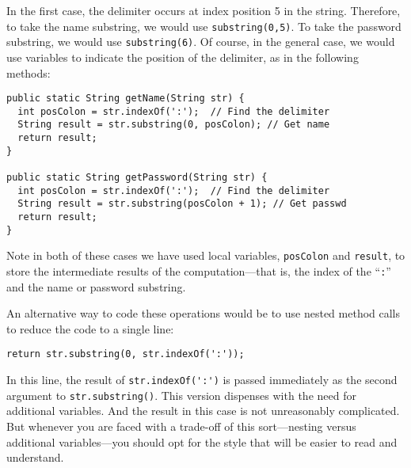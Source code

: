 \noindent In the first case, the delimiter occurs at index position 5 in
the string.  Therefore, to take the name substring, we would use
{\tt substring(0,5)}. To take the password substring, we would
use {\tt substring(6)}.  Of course, in the general case, we would
use variables to indicate the position of the delimiter, as in the
following methods:

\begin{jjjlisting}[27pc]
\begin{lstlisting}
public static String getName(String str) {
  int posColon = str.indexOf(':');  // Find the delimiter
  String result = str.substring(0, posColon); // Get name
  return result;
}

public static String getPassword(String str) {
  int posColon = str.indexOf(':');  // Find the delimiter
  String result = str.substring(posColon + 1); // Get passwd
  return result;
}
\end{lstlisting}
\end{jjjlisting}


\noindent Note in both of these cases we have used
local variables, {\tt posColon} and \mbox{\tt result}, to store the
intermediate results of the computation---that is, the index of the
``{\tt :}'' and the name or password substring.

An alternative way to code these operations would be to use nested
method calls to reduce the code to a single line:

\begin{jjjlisting}
\begin{lstlisting}
return str.substring(0, str.indexOf(':'));
\end{lstlisting}
\end{jjjlisting}

\noindent In this line, the result of {\tt str.indexOf(\verb!'!:\verb!'!)} is
passed immediately as the second argument to {\tt str.substring()}.
This version dispenses with the need for additional variables.
And the result in this case is not unreasonably complicated.
But whenever you are faced with a trade-off of this sort---nesting
versus additional variables---you should opt for the style that
will be easier to read and understand.




